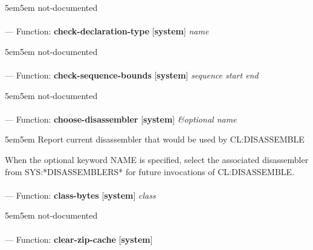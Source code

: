 \begin{adjustwidth}{5em}{5em}
not-documented
\end{adjustwidth}

\paragraph{}
\label{SYSTEM:CHECK-DECLARATION-TYPE}
--- Function: \textbf{check-declaration-type} [\textbf{system}] \textit{name}

\begin{adjustwidth}{5em}{5em}
not-documented
\end{adjustwidth}

\paragraph{}
\label{SYSTEM:CHECK-SEQUENCE-BOUNDS}
--- Function: \textbf{check-sequence-bounds} [\textbf{system}] \textit{sequence start end}

\begin{adjustwidth}{5em}{5em}
not-documented
\end{adjustwidth}

\paragraph{}
\label{SYSTEM:CHOOSE-DISASSEMBLER}
--- Function: \textbf{choose-disassembler} [\textbf{system}] \textit{\&optional name}

\begin{adjustwidth}{5em}{5em}
Report current disassembler that would be used by CL:DISASSEMBLE

When the optional keyword NAME is specified, select the associated
disassembler from SYS:*DISASSEMBLERS* for future invocations of
CL:DISASSEMBLE.
\end{adjustwidth}

\paragraph{}
\label{SYSTEM:CLASS-BYTES}
--- Function: \textbf{class-bytes} [\textbf{system}] \textit{class}

\begin{adjustwidth}{5em}{5em}
not-documented
\end{adjustwidth}

\paragraph{}
\label{SYSTEM:CLEAR-ZIP-CACHE}
--- Function: \textbf{clear-zip-cache} [\textbf{system}] \textit{}

